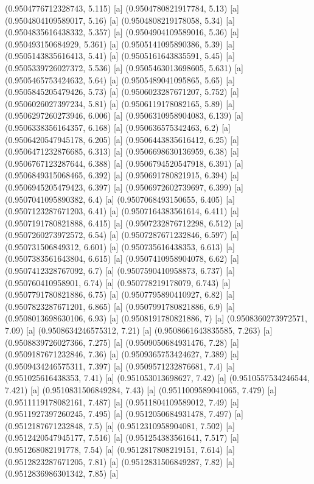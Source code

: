 {{{(0.9504776712328743, 5.115) [a] 
(0.9504780821917784, 5.13) [a] 
(0.9504804109589017, 5.16) [a] 
(0.9504808219178058, 5.34) [a] 
(0.9504835616438332, 5.357) [a] 
(0.9504904109589016, 5.36) [a] 
(0.950493150684929, 5.361) [a] 
(0.9505141095890386, 5.39) [a] 
(0.9505143835616413, 5.41) [a] 
(0.9505161643835591, 5.45) [a] 
(0.9505339726027372, 5.536) [a] 
(0.9505463013698605, 5.631) [a] 
(0.9505465753424632, 5.64) [a] 
(0.9505489041095865, 5.65) [a] 
(0.9505845205479426, 5.73) [a] 
(0.9506023287671207, 5.752) [a] 
(0.9506026027397234, 5.81) [a] 
(0.9506119178082165, 5.89) [a] 
(0.9506297260273946, 6.006) [a] 
(0.9506310958904083, 6.139) [a] 
(0.9506338356164357, 6.168) [a] 
(0.950636575342463, 6.2) [a] 
(0.9506420547945178, 6.205) [a] 
(0.9506443835616412, 6.25) [a] 
(0.9506471232876685, 6.313) [a] 
(0.9506698630136959, 6.38) [a] 
(0.9506767123287644, 6.388) [a] 
(0.9506794520547918, 6.391) [a] 
(0.9506849315068465, 6.392) [a] 
(0.950691780821915, 6.394) [a] 
(0.9506945205479423, 6.397) [a] 
(0.9506972602739697, 6.399) [a] 
(0.9507041095890382, 6.4) [a] 
(0.9507068493150655, 6.405) [a] 
(0.9507123287671203, 6.41) [a] 
(0.9507164383561614, 6.411) [a] 
(0.9507191780821888, 6.415) [a] 
(0.9507232876712298, 6.512) [a] 
(0.9507260273972572, 6.54) [a] 
(0.9507287671232846, 6.597) [a] 
(0.950731506849312, 6.601) [a] 
(0.950735616438353, 6.613) [a] 
(0.9507383561643804, 6.615) [a] 
(0.9507410958904078, 6.62) [a] 
(0.9507412328767092, 6.7) [a] 
(0.9507590410958873, 6.737) [a] 
(0.950760410958901, 6.74) [a] 
(0.950778219178079, 6.743) [a] 
(0.9507791780821886, 6.75) [a] 
(0.9507795890410927, 6.82) [a] 
(0.9507823287671201, 6.865) [a] 
(0.9507991780821886, 6.9) [a] 
(0.9508013698630106, 6.93) [a] 
(0.9508191780821886, 7) [a] 
(0.9508360273972571, 7.09) [a] 
(0.9508634246575312, 7.21) [a] 
(0.9508661643835585, 7.263) [a] 
(0.9508839726027366, 7.275) [a] 
(0.9509050684931476, 7.28) [a] 
(0.9509187671232846, 7.36) [a] 
(0.9509365753424627, 7.389) [a] 
(0.9509434246575311, 7.397) [a] 
(0.9509571232876681, 7.4) [a] 
(0.951025616438353, 7.41) [a] 
(0.951053013698627, 7.42) [a] 
(0.9510557534246544, 7.421) [a] 
(0.9510831506849284, 7.43) [a] 
(0.9511009589041065, 7.479) [a] 
(0.9511119178082161, 7.487) [a] 
(0.9511804109589012, 7.49) [a] 
(0.9511927397260245, 7.495) [a] 
(0.9512050684931478, 7.497) [a] 
(0.9512187671232848, 7.5) [a] 
(0.9512310958904081, 7.502) [a] 
(0.9512420547945177, 7.516) [a] 
(0.951254383561641, 7.517) [a] 
(0.951268082191778, 7.54) [a] 
(0.9512817808219151, 7.614) [a] 
(0.9512823287671205, 7.81) [a] 
(0.9512831506849287, 7.82) [a] 
(0.9512836986301342, 7.85) [a] 
}}}
